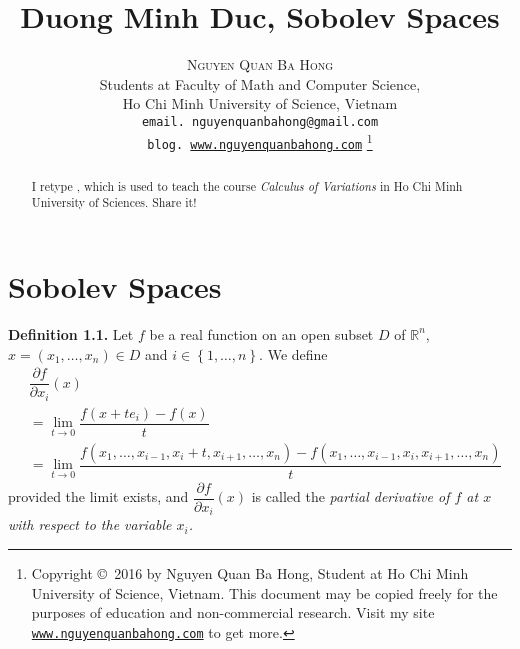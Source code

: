 \documentclass[a4paper]{article}
\title{\Huge Duong Minh Duc, Sobolev Spaces}
\author{\textsc{Nguyen Quan Ba Hong}\\
{\small Students at Faculty of Math and Computer Science,}\\ 
{\small Ho Chi Minh University of Science, Vietnam} \\
{\small \texttt{email. nguyenquanbahong@gmail.com}}\\
{\small \texttt{blog. \url{www.nguyenquanbahong.com}} 
\footnote{Copyright \copyright\ 2016 by Nguyen Quan Ba Hong, Student at Ho Chi Minh University of Science, Vietnam. This document may be copied freely for the purposes of education and non-commercial research. Visit my site \texttt{\url{www.nguyenquanbahong.com}} to get more.}}}
\numberwithin{equation}{section}
\begin{document}
\maketitle
\begin{abstract}
I retype \cite{1}, which is used to teach the course \textit{Calculus of Variations} in Ho Chi Minh University of Sciences. Share it!
\end{abstract}
\newpage
\tableofcontents
\newpage
\section{Sobolev Spaces}
\textbf{Definition 1.1.} Let $f$ be a real function on an open subset $D$ of $\mathbb{R}^n$, $x = \left( {{x_1}, \ldots ,{x_n}} \right) \in D$ and $i \in \left\{ {1, \ldots ,n} \right\}$. We define 
\begin{align}
&\dfrac{{\partial f}}{{\partial {x_i}}}\left( x \right) \\
&= \mathop {\lim }\limits_{t \to 0} \dfrac{{f\left( {x + t{e_i}} \right) - f\left( x \right)}}{t}\\
& = \mathop {\lim }\limits_{t \to 0} \dfrac{{f\left( {{x_1}, \ldots ,{x_{i - 1}},{x_i} + t,{x_{i + 1}}, \ldots ,{x_n}} \right) - f\left( {{x_1}, \ldots ,{x_{i - 1}},{x_i},{x_{i + 1}}, \ldots ,{x_n}} \right)}}{t}
\end{align}
provided the limit exists, and $\dfrac{{\partial f}}{{\partial {x_i}}}\left( x \right)$ is called the \textit{partial derivative of $f$ at $x$ with respect to the variable $x_i$.}
\end{document}
